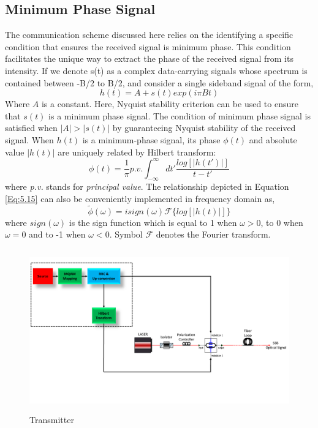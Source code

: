 \subsection{Minimum Phase Signal}
The communication scheme discussed here relies on the identifying a specific condition that ensures the received signal is minimum phase. This condition facilitates the unique way to extract the phase of the received signal from its intensity. If we denote s(t) as a complex data-carrying signals whose spectrum is contained between -B/2 to B/2, and consider a single sideband signal of the form,
\begin{equation}
h(t)=A+s(t)exp(i\pi Bt)
\end{equation}
Where $A$ is a constant. Here, Nyquist stability criterion can be used to ensure that $s(t)$ is a minimum phase signal. The condition of minimum phase signal is satisfied when $|A|>|s(t)|$ by guaranteeing Nyquist stability of the received signal.
When $h(t)$ is a minimum-phase signal, its phase $\phi(t)$ and absolute value $|h(t)|$ are uniquely related by Hilbert transform:
\begin{equation}
	\phi(t)=\frac{1}{\pi}  p.v. \int_{-\infty}^{\infty} dt' \frac{log[|h(t')|]}{t-t'}
	\label{Eq:5.15}
\end{equation}
where \textit{p.v.} stands for \textit{principal value}. The relationship depicted in Equation \ref{Eq:5.15} can also be conveniently implemented in frequency domain as,
\begin{equation}
\tilde{\phi}(\omega)=i sign(\omega) \mathcal{F} \{log[|h(t)|]\}
\label{Eq:5.16}
\end{equation}
where $sign(\omega)$ is the sign function which is equal to 1 when $\omega>0$, to 0 when $\omega=0$ and to -1 when $\omega<0$. Symbol $\mathcal{F}$ denotes the Fourier transform.
\begin{figure}[h]
	\centering
	\includegraphics[width=1.0\textwidth, height=7cm]{./sdf/simplified_coherent_receiver/figures/Single_Polarization_Tx.pdf}
	\caption{Transmitter}\label{Transmitter}
\end{figure}

